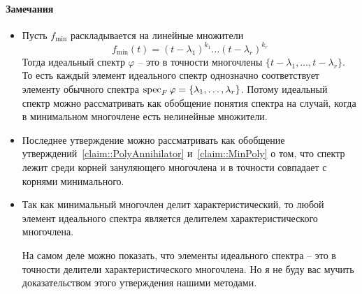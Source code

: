 \paragraph{Замечания}
\begin{itemize}
\item Пусть $f_{\text{min}}$ раскладывается на линейные множители
\[
f_{\text{min}}(t) = (t - \lambda_1)^{k_1}\ldots(t-\lambda_r)^{k_r}
\]
Тогда идеальный спектр $\varphi$ -- это в точности многочлены $\{t-\lambda_1,\ldots,t-\lambda_r\}$. То есть каждый элемент идеального спектр однозначно соответствует элементу обычного спектра $\operatorname{spec}_F\varphi = \{\lambda_1,\ldots,\lambda_r\}$. Потому идеальный спектр можно рассматривать как обобщение понятия спектра на случай, когда в минимальном многочлене есть нелинейные множители.

\item Последнее утверждение можно рассматривать как обобщение утверждений~\ref{claim::PolyAnnihilator} и~\ref{claim::MinPoly} о том, что спектр лежит среди корней зануляющего многочлена и в точности совпадает с корнями минимального.

\item Так как минимальный многочлен делит характеристический, то любой элемент идеального спектра является делителем характеристического многочлена. 

На самом деле можно показать, что элементы идеального спектра -- это в точности делители характеристического многочлена. Но я не буду вас мучить доказательством этого утверждения нашими методами.


\end{itemize}
